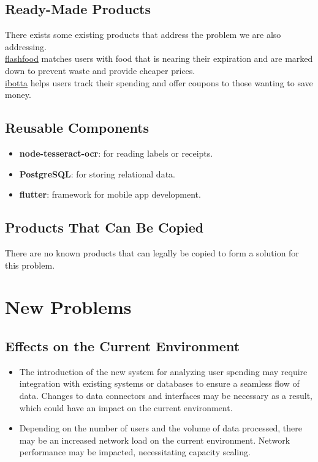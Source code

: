 \documentclass[12pt]{article}
\begin{document}
\subsection{Ready-Made Products}
There exists some existing products that address the problem we are also addressing. \\

\href{https://www.flashfood.com/}{flashfood} matches users with food that is nearing their expiration and are marked down to prevent waste and provide cheaper prices.\\

\href{https://home.ibotta.com/}{ibotta} helps users track their spending and offer coupons to those wanting to save money.\\

\subsection{Reusable Components}
\begin{itemize}
  \item \textbf{node-tesseract-ocr}: for reading labels or receipts.
  \item \textbf{PostgreSQL}: for storing relational data.
  \item \textbf{flutter}: framework for mobile app development.
\end{itemize}

\subsection{Products That Can Be Copied}
There are no known products that can legally be copied to form a solution for this problem.

\section{New Problems}
\subsection{Effects on the Current Environment}
\begin{itemize}
    \item The introduction of the new system for analyzing user spending may require integration with existing systems or databases to ensure a seamless flow of data. Changes to data connectors and interfaces may be necessary as a result, which could have an impact on the current environment.
    \item Depending on the number of users and the volume of data processed, there may be an increased network load on the current environment. Network performance may be impacted, necessitating capacity scaling.
\end{itemize}
\end{document}
